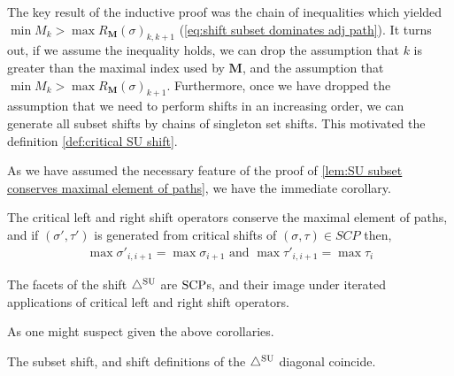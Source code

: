 The key result of the inductive proof was the chain of inequalities which yielded $\min M_k > \max R_{\mathbf{M}}(\sigma)_{k,k+1}$ (\cref{eq:shift subset dominates adj path}).
It turns out, if we assume the inequality holds, we can drop the assumption that $k$ is greater than the maximal index used by $\mathbf{M}$, and the assumption that $\min M_k > \max R_{\mathbf{M}}(\sigma)_{k+1}$. 
Furthermore, once we have dropped the assumption that we need to perform shifts in an increasing order, we can generate all subset shifts by chains of singleton set shifts. This motivated the definition \cref{def:critical SU shift}.

As we have assumed the necessary feature of the proof of \cref{lem:SU subset conserves maximal element of paths}, we have the immediate corollary.

\begin{corollary} \label{cor: SU shift conserves maximal element of paths}
The critical left and right shift operators conserve the maximal element of paths, and if $(\sigma',\tau')$ is generated from critical shifts of $(\sigma,\tau) \in SCP$ then,
\begin{align*}
    \max \sigma'_{i,i+1} = \max \sigma_{i+1} \text{ and } \max \tau'_{i,i+1} = \max \tau_{i}
\end{align*}
\end{corollary}

\begin{definition}
The facets of the shift $\triangle^{\mathrm{SU}}$ are $\mathrm{SCP}$s, and their image under iterated applications of critical left and right shift operators.
\end{definition}

As one might suspect given the above corollaries.

\begin{proposition}\label{prop:subset shift to shift bijection}
The subset shift, and shift definitions of the $\triangle^{\mathrm{SU}}$ diagonal coincide.
\end{proposition}

